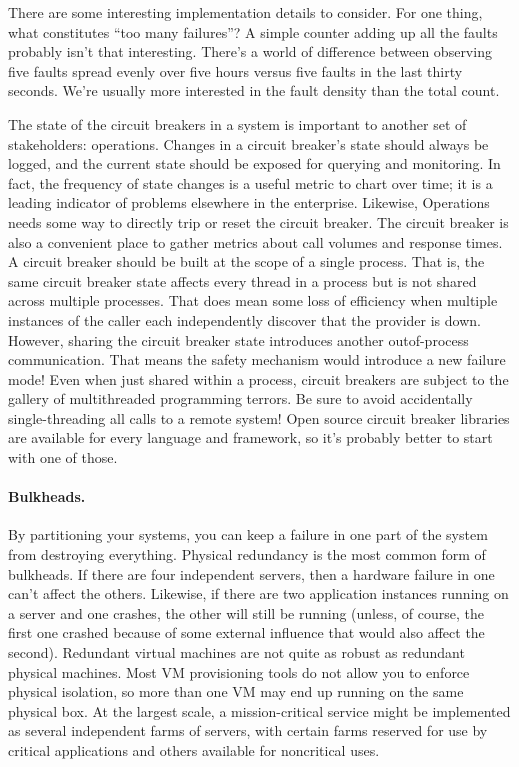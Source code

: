 There are some interesting implementation details to consider. For one thing, what constitutes “too many failures”? A simple counter adding up all the faults probably isn’t that interesting. There’s a world of difference between observing five faults spread evenly over five hours versus five faults in the last thirty seconds. We’re usually more interested in the fault density than the total count.

The state of the circuit breakers in a system is important to another set of stakeholders: operations. Changes in a circuit breaker’s state should always be logged, and the current state should be exposed for querying and monitoring. In fact, the frequency of state changes is a useful metric to chart over time; it is a leading indicator of problems elsewhere in the enterprise. Likewise, Operations needs some way to directly trip or reset the circuit breaker. The circuit breaker is also a convenient place to gather metrics about call volumes and response times. A circuit breaker should be built at the scope of a single process. That is, the same circuit breaker state affects every thread in a process but is not shared across multiple processes. That does mean some loss of efficiency when multiple instances of the caller each independently discover that the provider is down. However, sharing the circuit breaker state introduces another outof-process communication. That means the safety mechanism would introduce a new failure mode! Even when just shared within a process, circuit breakers are subject to the gallery of multithreaded programming terrors. Be sure to avoid accidentally single-threading all calls to a remote system! Open source circuit breaker libraries are available for every language and framework, so it’s probably better to start with one of those.

\paragraph{Bulkheads.} By partitioning your systems, you can keep a failure in one part of the system from destroying everything. Physical redundancy is the most common form of bulkheads. If there are four independent servers, then a hardware failure in one can’t affect the others. Likewise, if there are two application instances running on a server and one crashes, the other will still be running (unless, of course, the first one crashed because of some external influence that would also affect the second). Redundant virtual machines are not quite as robust as redundant physical machines. Most VM provisioning tools do not allow you to enforce physical isolation, so more than one VM may end up running on the same physical box. At the largest scale, a mission-critical service might be implemented as several independent farms of servers, with certain farms reserved for use by critical applications and others available for noncritical uses.

